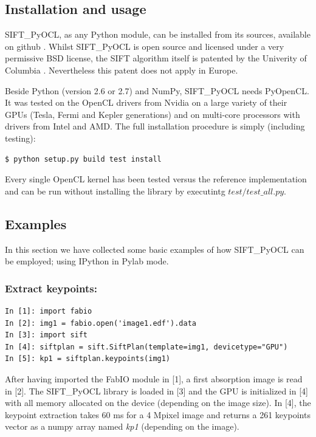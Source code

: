 \documentclass[preprint]{iucr}
\begin{document}
\subsection{Installation and usage}
SIFT\_PyOCL, as any Python module, can be installed from its sources,
available on github \cite{sift_pyocl}.
Whilst SIFT\_PyOCL is open source and licensed under a very
permissive BSD license, the SIFT algorithm itself is
patented by the Univerity of Columbia \cite{SIFT_pat}.
Nevertheless this patent does not apply in Europe.

Beside Python (version 2.6 or 2.7) and NumPy, SIFT\_PyOCL needs
PyOpenCL.
It was tested on the OpenCL drivers from Nvidia on a
large variety of their GPUs (Tesla, Fermi and Kepler generations) and on
multi-core processors with drivers from Intel and AMD.
The full installation procedure is simply (including testing):
\begin{verbatim}
$ python setup.py build test install
\end{verbatim}
Every single OpenCL kernel has been tested versus the reference
implementation and can be run without installing the library by
executintg $test/test\_all.py$.

\subsection{Examples}

In this section we have collected some basic examples of how
SIFT\_PyOCL can be employed; using IPython \cite{ipython} in
Pylab \cite{matplotlib} mode.

\subsubsection{Extract keypoints:}
\begin{verbatim}
In [1]: import fabio
In [2]: img1 = fabio.open('image1.edf').data
In [3]: import sift
In [4]: siftplan = sift.SiftPlan(template=img1, devicetype="GPU")
In [5]: kp1 = siftplan.keypoints(img1)
\end{verbatim}

After having imported the FabIO \cite{fabio} module in [1], a first
absorption image is read in [2]. The SIFT\_PyOCL library is loaded in [3] and the
GPU is initialized in [4] with all memory allocated on the device (depending on
the image size).
In [4], the keypoint extraction takes 60 ms for a
4 Mpixel image and returns a 261 keypoints vector as a numpy array named
\emph{kp1} (depending on the image).
\end{document}
